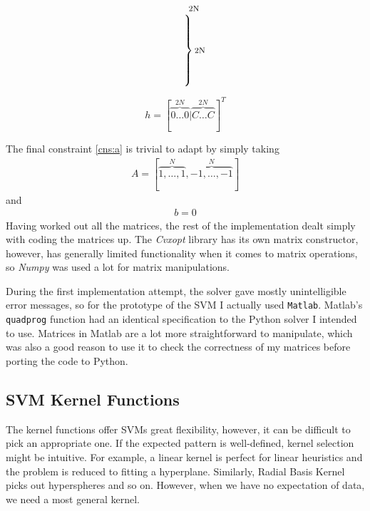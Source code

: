 \documentclass[12pt,notitlepage,twoside]{scrreprt}
\begin{document}
\[\begin{matrix}
\begin{matrix}
      \text{\footnotesize 2N} \\
        \left.\vphantom{\begin{matrix} 0 \\ 0 \\ 0 \\ 0 \\ 0 \\ 0 \end{matrix}}\right\}
      \text{\footnotesize 2N} 
    \end{matrix}
    \mspace{-33mu}
\end{matrix}
\]


\[h = [\overbrace{0 \dots 0}^{2N}|\overbrace{C \dots C}^{2N}]^T\]

The final constraint \ref{cns:a} is trivial to adapt by simply taking 
\begin{gather*}
A=[\overbrace{1,\dots,1}^N,\overbrace{-1,\dots,-1}^N]
\end{gather*}
and
\begin{gather*}
b=0
\end{gather*}
Having worked out all the matrices, the rest of the implementation dealt simply
with coding the matrices up. The \textit{Cvxopt} library has its own matrix constructor,
however, has generally limited functionality when it comes to matrix
operations, so \textit{Numpy} was used a lot for matrix manipulations. 

During the first
implementation attempt, the solver gave mostly unintelligible error messages,
so for the prototype of the SVM I actually used \texttt{Matlab}. Matlab's \texttt{quadprog}
function had an identical specification to the Python solver I intended to use.
Matrices in Matlab are a lot more straightforward to manipulate, which was also
a good reason to use it to check the correctness of my matrices before porting the code to
Python.

\subsection{SVM Kernel Functions}
\label{sec:kernels}
The kernel functions offer SVMs great flexibility, however, it can be difficult to pick an
appropriate one. If the expected pattern is well-defined, kernel selection might be
intuitive. For example, a linear kernel is perfect for linear heuristics and the problem
is reduced to fitting a hyperplane.  Similarly, Radial Basis Kernel picks out hyperspheres
and so on. However, when we have no expectation of data, we need a most general kernel.
\end{document}
